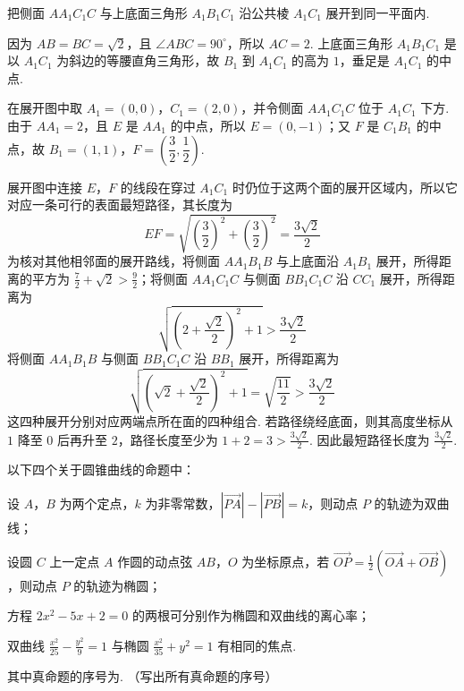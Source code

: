 \begin{solution}
把侧面 \(AA_{1}C_{1}C\) 与上底面三角形 \(A_{1}B_{1}C_{1}\) 沿公共棱 \(A_{1}C_{1}\) 展开到同一平面内.

因为 \(AB=BC=\sqrt2\)，且 \(\angle ABC=90^{\circ}\)，所以 \(AC=2\). 上底面三角形 \(A_{1}B_{1}C_{1}\) 是以 \(A_{1}C_{1}\) 为斜边的等腰直角三角形，故 \(B_{1}\) 到 \(A_{1}C_{1}\) 的高为 \(1\)，垂足是 \(A_{1}C_{1}\) 的中点.

在展开图中取 \(A_{1}=(0,0)\)，\(C_{1}=(2,0)\)，并令侧面 \(AA_{1}C_{1}C\) 位于 \(A_{1}C_{1}\) 下方. 由于 \(AA_{1}=2\)，且 \(E\) 是 \(AA_{1}\) 的中点，所以 \(E=(0,-1)\)；又 \(F\) 是 \(C_{1}B_{1}\) 的中点，故 \(B_{1}=(1,1)\)，\(F=\left(\dfrac32,\dfrac12\right)\).

展开图中连接 \(E\)，\(F\) 的线段在穿过 \(A_{1}C_{1}\) 时仍位于这两个面的展开区域内，所以它对应一条可行的表面最短路径，其长度为
\[
EF=\sqrt{\left(\frac32\right)^2+\left(\frac32\right)^2}
=\frac{3\sqrt2}{2}
\]
为核对其他相邻面的展开路线，将侧面 \(AA_{1}B_{1}B\) 与上底面沿 \(A_{1}B_{1}\) 展开，所得距离的平方为
\(\frac72+\sqrt2>\frac92\)；将侧面 \(AA_{1}C_{1}C\) 与侧面 \(BB_{1}C_{1}C\) 沿 \(CC_{1}\) 展开，所得距离为
\[
\sqrt{\left(2+\frac{\sqrt2}{2}\right)^2+1}>\frac{3\sqrt2}{2}
\]
将侧面 \(AA_{1}B_{1}B\) 与侧面 \(BB_{1}C_{1}C\) 沿 \(BB_{1}\) 展开，所得距离为
\[
\sqrt{\left(\sqrt2+\frac{\sqrt2}{2}\right)^2+1}
=\sqrt{\frac{11}{2}}>\frac{3\sqrt2}{2}
\]
这四种展开分别对应两端点所在面的四种组合. 若路径绕经底面，则其高度坐标从 \(1\) 降至 \(0\) 后再升至 \(2\)，路径长度至少为 \(1+2=3>\frac{3\sqrt2}{2}\). 因此最短路径长度为
\(\frac{3\sqrt2}{2}\).
\end{solution}

\begin{problem}
以下四个关于圆锥曲线的命题中：

\begin{circlelist}
\item 设 \(A\)，\(B\) 为两个定点，\(k\) 为非零常数，\(\left|\overrightarrow{PA}\right|-\left|\overrightarrow{PB}\right|=k\)，则动点 \(P\) 的轨迹为双曲线；
\item 设圆 \(C\) 上一定点 \(A\) 作圆的动点弦 \(AB\)，\(O\) 为坐标原点，若 \(\overrightarrow{OP}=\frac{1}{2}\left(\overrightarrow{OA}+\overrightarrow{OB}\right)\)，则动点 \(P\) 的轨迹为椭圆；
\item 方程 \(2x^{2}-5x+2=0\) 的两根可分别作为椭圆和双曲线的离心率；
\item 双曲线 \(\frac{x^{2}}{25}-\frac{y^{2}}{9}=1\) 与椭圆 \(\frac{x^{2}}{35}+y^{2}=1\) 有相同的焦点.
\end{circlelist}

其中真命题的序号为\fillinblank{}. （写出所有真命题的序号）
\end{problem}

